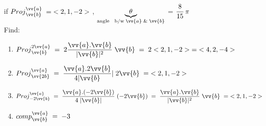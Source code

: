 \noindent{\color{smalt(darkpowderblue)}\rule{\linewidth}{.2mm}}
\begin{example}
if ${Proj}_{\vv{b}}^{\vv{a}} \; = \;<2 , 1 , -2>$ , $\underbrace{\theta}_{\text{angle \; b/w} \; \vv{a} \; \& \;  \vv{b}}$ = $\cfrac{8}{15} \; \pi$\\
Find:
\begin{enumerate}
\item ${Proj}_{\vv{b}}^{2\vv{a}} \; = \; 2 \dfrac{\vv{a} . \vv{b}}{|\vv{b}|^2} \; \vv{b} \; = \; 2<2,1,-2> \; = \;<4 , 2 , -4>$
\item ${Proj}_{\vv{2b}}^{\vv{a}} \; = \; \dfrac{\vv{a} . 2\vv{b}}{4 |\vv{b}}| \; 2\vv{b} \; = \;<2,1,-2>$\\
\item ${Proj}_{-2\vv{b}}^{\vv{a}} \; = \; \dfrac{\vv{a} . (-2\vv{b})}{4 \; |\vv{b}|} \; (-2\vv{b}) \; = \; \dfrac{\vv{a} . \vv{b}}{|\vv{b}|^2} \; \vv{b} \; = \;<2 , 1 , -2>$\\
\item ${comp}_{\vv{b}}^{\vv{a}} \; = \; -3$
\end{enumerate}
\end{example}
\noindent{\color{smalt(darkpowderblue)}\rule{\linewidth}{.2mm}}
